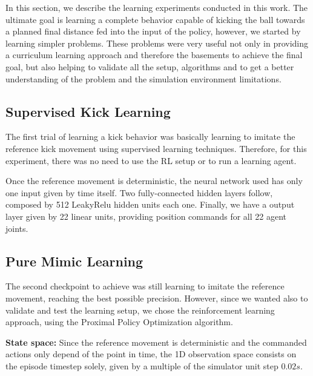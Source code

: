 In this section, we describe the learning experiments conducted in this work. The ultimate goal is learning a complete behavior capable of kicking the ball towards a planned final distance fed into the input of the policy, however, we started by learning simpler problems. These problems were very useful not only in providing a curriculum learning approach \cite{BengioCurrLearning} and therefore the basements to achieve the final goal, but also helping to validate all the setup, algorithms and to get a better understanding of the problem and the simulation environment limitations.

\subsection{Supervised Kick Learning}

The first trial of learning a kick behavior was basically learning to imitate the reference kick movement using supervised learning techniques. Therefore, for this experiment, there was no need to use the RL setup or to run a learning agent.

Once the reference movement is deterministic, the neural network used has only one input given by time itself. Two fully-connected hidden layers follow, composed by 512 LeakyRelu hidden units each one. Finally, we have a output layer given by 22 linear units, providing position commands for all 22 agent joints.


\subsection{Pure Mimic Learning}

The second checkpoint to achieve was still learning to imitate the reference movement, reaching the best possible precision. However, since we wanted also to validate and test the learning setup, we chose the reinforcement learning approach, using the Proximal Policy Optimization algorithm.

\textbf{State space:} Since the reference movement is deterministic and the commanded actions only depend of the point in time, the 1D observation space consists on the episode timestep solely, given by a multiple of the simulator unit step $0.02s$.

